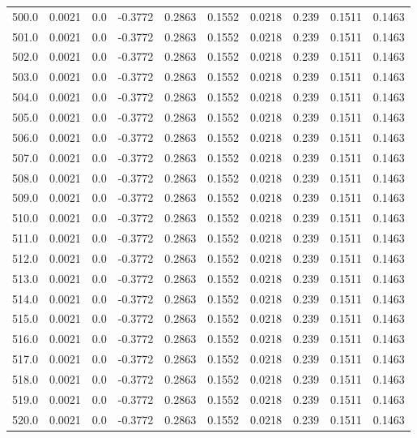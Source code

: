 \begin{longtable}{lrrrrrrrrr}
500.0 & 0.0021 & 0.0 & -0.3772 & 0.2863 & 0.1552 & 0.0218 & 0.239 & 0.1511 & 0.1463 \\
501.0 & 0.0021 & 0.0 & -0.3772 & 0.2863 & 0.1552 & 0.0218 & 0.239 & 0.1511 & 0.1463 \\
502.0 & 0.0021 & 0.0 & -0.3772 & 0.2863 & 0.1552 & 0.0218 & 0.239 & 0.1511 & 0.1463 \\
503.0 & 0.0021 & 0.0 & -0.3772 & 0.2863 & 0.1552 & 0.0218 & 0.239 & 0.1511 & 0.1463 \\
504.0 & 0.0021 & 0.0 & -0.3772 & 0.2863 & 0.1552 & 0.0218 & 0.239 & 0.1511 & 0.1463 \\
505.0 & 0.0021 & 0.0 & -0.3772 & 0.2863 & 0.1552 & 0.0218 & 0.239 & 0.1511 & 0.1463 \\
506.0 & 0.0021 & 0.0 & -0.3772 & 0.2863 & 0.1552 & 0.0218 & 0.239 & 0.1511 & 0.1463 \\
507.0 & 0.0021 & 0.0 & -0.3772 & 0.2863 & 0.1552 & 0.0218 & 0.239 & 0.1511 & 0.1463 \\
508.0 & 0.0021 & 0.0 & -0.3772 & 0.2863 & 0.1552 & 0.0218 & 0.239 & 0.1511 & 0.1463 \\
509.0 & 0.0021 & 0.0 & -0.3772 & 0.2863 & 0.1552 & 0.0218 & 0.239 & 0.1511 & 0.1463 \\
510.0 & 0.0021 & 0.0 & -0.3772 & 0.2863 & 0.1552 & 0.0218 & 0.239 & 0.1511 & 0.1463 \\
511.0 & 0.0021 & 0.0 & -0.3772 & 0.2863 & 0.1552 & 0.0218 & 0.239 & 0.1511 & 0.1463 \\
512.0 & 0.0021 & 0.0 & -0.3772 & 0.2863 & 0.1552 & 0.0218 & 0.239 & 0.1511 & 0.1463 \\
513.0 & 0.0021 & 0.0 & -0.3772 & 0.2863 & 0.1552 & 0.0218 & 0.239 & 0.1511 & 0.1463 \\
514.0 & 0.0021 & 0.0 & -0.3772 & 0.2863 & 0.1552 & 0.0218 & 0.239 & 0.1511 & 0.1463 \\
515.0 & 0.0021 & 0.0 & -0.3772 & 0.2863 & 0.1552 & 0.0218 & 0.239 & 0.1511 & 0.1463 \\
516.0 & 0.0021 & 0.0 & -0.3772 & 0.2863 & 0.1552 & 0.0218 & 0.239 & 0.1511 & 0.1463 \\
517.0 & 0.0021 & 0.0 & -0.3772 & 0.2863 & 0.1552 & 0.0218 & 0.239 & 0.1511 & 0.1463 \\
518.0 & 0.0021 & 0.0 & -0.3772 & 0.2863 & 0.1552 & 0.0218 & 0.239 & 0.1511 & 0.1463 \\
519.0 & 0.0021 & 0.0 & -0.3772 & 0.2863 & 0.1552 & 0.0218 & 0.239 & 0.1511 & 0.1463 \\
520.0 & 0.0021 & 0.0 & -0.3772 & 0.2863 & 0.1552 & 0.0218 & 0.239 & 0.1511 & 0.1463 \\

\end{longtable}
